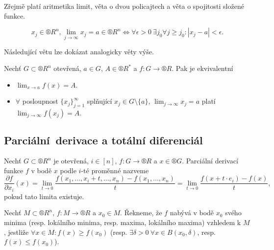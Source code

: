 \documentclass[12pt]{article}					%
\begin{document}
	\begin{poznamka}
		Zřejmě platí aritmetika limit, věta o dvou policajtech a věta o spojitosti složené funkce.
	\end{poznamka}

	\begin{definice}
		$$ x_j \in ®R^n, \lim_{j \rightarrow ∞} x_j = a \in ®R^n \Leftrightarrow \forall \epsilon > 0\ \exists j_0 \forall j ≥ j_0: |x_j - a|<\epsilon. $$
	\end{definice}

	\begin{poznamka}
		Následující větu lze dokázat analogicky věty výše.
	\end{poznamka}

	\begin{veta}[Heine]
		Nechť $G \subset ®R^n$ otevřená, $a \in G$, $A \in ®R^*$ a $f: G \rightarrow ®R$. Pak je ekvivalentní

		\begin{itemize}
			\item $\lim_{x \rightarrow a} f(x) = A$.
			\item $\forall$ posloupnost $\{x_j\}_{j=1}^∞$ splňující $x_j \in G \setminus \{a\}$, $\lim_{j \rightarrow ∞} x_j = a$ platí $\lim_{j \rightarrow ∞} f(x_j) = A$.
		\end{itemize}
	\end{veta}

	\subsection{Parciální derivace a totální diferenciál}
	\begin{definice}
		Nechť $G \subset ®R^n$ je otevřená, $i \in [n]$, $f: G \rightarrow ®R$ a $x \in ®G$. Parciální derivací funkce $f$ v bodě $x$ podle $i$-té proměnné nazveme
		$$ \frac{\partial f}{\partial x_i}(x) = \lim_{t \rightarrow 0} \frac{f(x_1, …, x_i + t, …, x_n) - f(x_1, …, x_n)}{t} = \lim_{t \rightarrow 0} \frac{f(x+t·e_i) - f(x)}{t}, $$
		pokud tato limita existuje.
	\end{definice}

	\begin{definice}[Extrémy]
		Nechť $M \subset ®R^n$, $f: M \rightarrow ®R$ a $x_0 \in M$. Řekneme, že $f$ nabývá v bodě $x_0$ svého minima (resp. lokálního minima, resp. maxima, lokálního maxima) vzhledem k $M$, jestliže $\forall x \in M: f(x) ≥ f(x_0)$ (resp. $\exists \delta > 0\ \forall x \in B(x_0, \delta)$, resp. $f(x) ≤ f(x_0)$).
	\end{definice}
\end{document}
